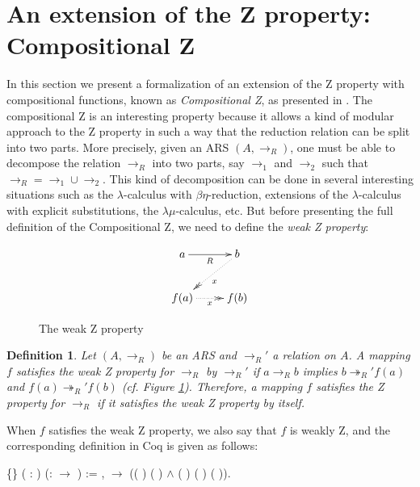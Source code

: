\documentclass[a4paper]{article}
\newcommand{\tto}{\twoheadrightarrow}
\newtheorem{definition}{Definition}[section]
\begin{document}
\section{An extension of the Z property: Compositional Z}

In this section we present a formalization of an extension of the Z
property with compositional functions, known as \textit{Compositional
  Z}, as presented in \cite{Nakazawa-Fujita2016}. The compositional Z
is an interesting property because it allows a kind of modular
approach to the Z property in such a way that the reduction relation
can be split into two parts. More precisely, given an ARS $(A,\to_R)$,
one must be able to decompose the relation $\to_R$ into two parts, say
$\to_1$ and $\to_2$ such that $\to_R = \to_1\cup \to_2$. This kind of
decomposition can be done in several interesting situations such as
the $\lambda$-calculus with $\beta\eta$-reduction\cite{Ba84},
extensions of the $\lambda$-calculus with explicit
substitutions\cite{accl91}, the $\lambda\mu$-calculus\cite{Parigot92},
etc. But before presenting the full definition of the Compositional Z,
we need to define the \textit{weak Z property}:


\begin{figure}[h] \centering \[ \xymatrix{ a \ar[r]_R & b
      \ar@{.>>}[dl]^x\\ f(a) \ar@{.>>}[r]_x & f(b) \\ } \]
  \caption{The weak Z property}\label{fig:weakZ}
\end{figure}


\begin{definition} Let $(A,\to_R)$ be an ARS and $\to_R'$ a
  relation on $A$. A mapping $f$ satisfies the {\it weak Z
    property} for $\to_R$ by $\to_R'$ if $a\to_R b$ implies $b \tto_R'
  f(a)$ and $f(a) \tto_R' f(b)$ (cf. Figure
  \ref{fig:weakZ}). Therefore, a mapping $f$ satisfies the Z
  property for $\to_R$ if it satisfies the weak Z property by
  itself.
\end{definition}


When $f$ satisfies the weak Z property, we also say that $f$ is weakly
Z, and the corresponding definition in Coq is given as
follows: \begin{coqdoccode} \coqdocemptyline \coqdocnoindent
    \{\}
  ( :  )
  (:  \ensuremath{\rightarrow}
  ) := \coqdockw{\ensuremath{\forall}} 
  ,   
  \ensuremath{\rightarrow} (( )
   ( ) \ensuremath{\land}
  ( ) ( )
  ( )).\coqdoceol \coqdocemptyline
\end{coqdoccode}
\end{document}
